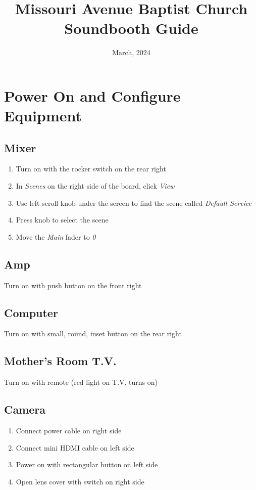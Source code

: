 \documentclass[12pt]{article}
\title{Missouri Avenue Baptist Church\\Soundbooth Guide}
\date{March, 2024}
\let\oldtableofcontents\tableofcontents%
\renewcommand\tableofcontents{
  \oldtableofcontents%
  \clearpage
}
\begin{document}
\maketitle
\thispagestyle{empty} %

\tableofcontents


\section{Power On and Configure Equipment}

    \subsection{Mixer}
    \begin{enumerate}
        \item Turn on with the rocker switch on the rear right
        \item In \emph{Scenes} on the right side of the board, click \emph{View}
        \item Use left scroll knob under the screen to find the scene called \emph{Default Service}
        \item Press knob to select the scene
        \item Move the \emph{Main} fader to \emph{0}
    \end{enumerate}

    \subsection{Amp}
        Turn on with push button on the front right

    \subsection{Computer}
        Turn on with small, round, inset button on the rear right

    \subsection{Mother's Room T.V.}
        Turn on with remote (red light on T.V. turns on)

    \subsection{Camera}
    \begin{enumerate}
        \item Connect power cable on right side
        \item Connect mini HDMI cable on left side
        \item Power on with rectangular button on left side
        \item Open lens cover with switch on right side
    \end{enumerate}
\end{document}
